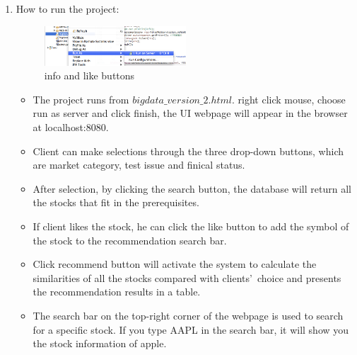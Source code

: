 \documentclass[10pt, conference, compsocconf]{IEEEtran}
\begin{document}
\begin{enumerate}[label=\Alph*]
\item How to run the project:\\

 \begin{figure}[!h]
            \centering
           \includegraphics[width=0.5\textwidth]{figures/server.jpg}
           \caption{info and like buttons}
          \vspace{0.1cm}
    \end{figure}
    
\begin{itemize}
\item The project runs from $bigdata\_version\_2.html$. right click mouse, choose run as server and click finish, the UI webpage will appear in the browser at localhost:8080.
\item Client can make selections through the three drop-down buttons, which are market category, test issue and finical status.
\item After selection, by clicking the search button, the database will return all the stocks that fit in the prerequisites.
\item If client likes the stock, he can click the like button to add the symbol of the stock to the recommendation search bar.
\item Click recommend button will activate the system to calculate the similarities of all the stocks compared with clients\rq\ choice and presents the recommendation results in a table.
\item  The search bar on the top-right corner of the webpage is used to search for a specific stock.  If you type AAPL in the search bar, it will show you the stock information of apple.
\end{itemize}


\end{enumerate}






\end{document}
